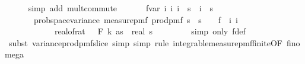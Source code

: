 \begin{isabellebody}
\ \ \ \ \isamarkupfalse%
\ {\isacharparenleft}{\kern0pt}simp\ add{\isacharcolon}{\kern0pt}\ mult{\isachardot}{\kern0pt}commute{\isacharparenright}{\kern0pt}\isanewline
\ \ \isanewline
\ \ \isamarkupfalse%
\ f{}{\isacharunderscore}{\kern0pt}var{\isacharcolon}{\kern0pt}\ {\isachardoublequoteopen}{\isasymAnd}i\ i\ i\ {\isacharless}{\kern0pt}\ s\ {\isasymLongrightarrow}\ i\ {\isacharless}{\kern0pt}\ s\ {\isasymLongrightarrow}\isanewline
\ \ \ \ \ \ \ prob{\isacharunderscore}{\kern0pt}space{\isachardot}{\kern0pt}variance\ {\isacharparenleft}{\kern0pt}measure{\isacharunderscore}{\kern0pt}pmf\ {\isacharparenleft}{\kern0pt}prod{\isacharunderscore}{\kern0pt}pmf\ {\isacharparenleft}{\kern0pt}{\isacharbraceleft}{\kern0pt}{}{\isachardot}{\kern0pt}{\isachardot}{\kern0pt}{\isacharless}{\kern0pt}s\ {\isasymtimes}\ {\isacharbraceleft}{\kern0pt}{}{\isachardot}{\kern0pt}{\isachardot}{\kern0pt}{\isacharless}{\kern0pt}s\ {\isacharparenleft}{\kern0pt}{\isasymlambda}{\isacharunderscore}{\kern0pt}{\isachardot}{\kern0pt}\ {\isasymOmega}{\isacharparenright}{\kern0pt}{\isacharparenright}{\kern0pt}{\isacharparenright}{\kern0pt}\ {\isacharparenleft}{\kern0pt}{\isasymlambda}{\isasymomega}{\isachardot}{\kern0pt}\ f{}\ {\isasymomega}\ i\ i\isanewline
\ \ \ \ \ \ \ \ \ \ \ {\isasymle}\ {\isacharparenleft}{\kern0pt}real{\isacharunderscore}{\kern0pt}of{\isacharunderscore}{\kern0pt}rat\ {\isacharparenleft}{\kern0pt}{\isasymdelta}\ {\isacharasterisk}{\kern0pt}\ F\ k\ as{\isacharparenright}{\kern0pt}{\isacharparenright}{\kern0pt}\ {\isacharasterisk}{\kern0pt}\ real\ s\ {\isacharslash}{\kern0pt}\ {}{\isachardoublequoteclose}\ \isanewline
\ \ \ \ \isamarkupfalse%
\ {\isacharparenleft}{\kern0pt}simp\ only{\isacharcolon}{\kern0pt}\ f{}{\isacharunderscore}{\kern0pt}def{\isacharparenright}{\kern0pt}\isanewline
\ \ \ \ \isamarkupfalse%
\ {\isacharparenleft}{\kern0pt}subst\ variance{\isacharunderscore}{\kern0pt}prod{\isacharunderscore}{\kern0pt}pmf{\isacharunderscore}{\kern0pt}slice{\isacharcomma}{\kern0pt}\ simp{\isacharcomma}{\kern0pt}\ simp{\isacharcomma}{\kern0pt}\ rule\ integrable{\isacharunderscore}{\kern0pt}measure{\isacharunderscore}{\kern0pt}pmf{\isacharunderscore}{\kern0pt}finite{\isacharbrackleft}{\kern0pt}OF\ fin{\isacharunderscore}{\kern0pt}omega{\isacharbrackright}{\kern0pt}{\isacharparenright}{\kern0pt}\isanewline

\end{isabellebody}
